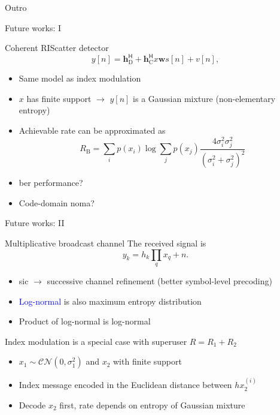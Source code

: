 \documentclass[presentation,xcolor={table},9pt]{beamer}
\begin{document}
\begin{section}{Outro}
	\begin{frame}{Future works: I}
		\begin{block}{Coherent RIScatter detector}
			\begin{equation*}
				y[n] = {\mathbf{h}_{\text{D}}^\mathsf{H} + \mathbf{h}_{\text{C}}^\mathsf{H} {x}} \mathbf{w} {s[n]} + v[n],
			\end{equation*}
			\begin{itemize}
				\item Same model as index modulation
				\item $x$ has finite support $\to$ $y[n]$ is a Gaussian mixture (non-elementary entropy)
				\item Achievable rate can be approximated as
				\begin{equation*}
					R_\text{B} = \sum_i p(x_i) \log \sum_j p(x_j) \frac{4 \sigma_i^2 \sigma_j^2}{(\sigma_i^2 + \sigma_j^2)^2}
				\end{equation*}
				\item \gls{ber} performance?
				\item Code-domain \gls{noma}?
			\end{itemize}
		\end{block}
	\end{frame}

	\begin{frame}{Future works: II}
		\begin{block}{Multiplicative broadcast channel}
			The received signal is
			\begin{equation*}
				y_k = h_k \prod_q x_q + n.
			\end{equation*}
			\begin{itemize}
				\item \gls{sic} $\to$ successive channel refinement (better symbol-level precoding)
				\item \textcolor{blue}{Log-normal} is also maximum entropy distribution
				\item Product of log-normal is log-normal
			\end{itemize}
		\end{block}

		\begin{exampleblock}{Index modulation is a special case with superuser $R = R_1 + R_2$}
			\begin{itemize}
				\item $x_1 \sim \mathcal{CN}(0, \sigma_1^2)$ and $x_2$ with finite support
				\item Index message encoded in the Euclidean distance between $h x_2^{(i)}$
				\item Decode $x_2$ first, rate depends on {entropy of Gaussian mixture}
			\end{itemize}
		\end{exampleblock}
	\end{frame}


\end{section}
\end{document}
